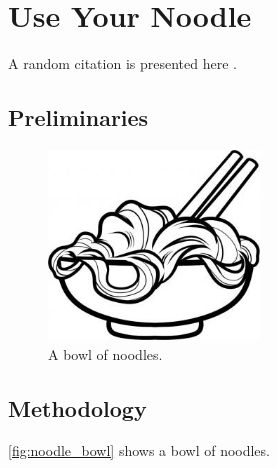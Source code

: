 \chapter{Use Your Noodle}
\label{ch:noodle}

A random citation is presented here \cite{schwartz03}.

\lipsum[1]

\section{Preliminaries}

\lipsum[4-5]

\begin{figure}[htbp]
    \centering
    \includegraphics[width=0.5\textwidth]{images/noodle.jpg}
    \caption{A bowl of noodles.}
    \label{fig:noodle_bowl}
\end{figure}

\section{Methodology}

\autoref{fig:noodle_bowl} shows a bowl of noodles.
